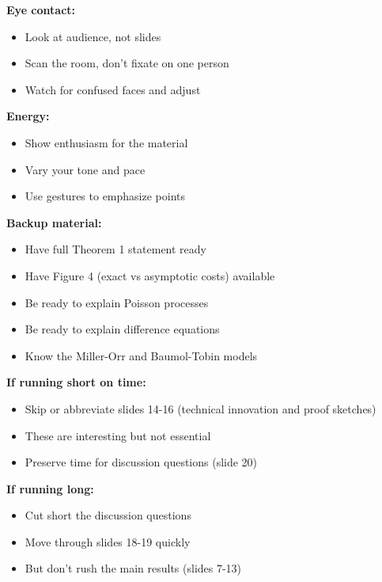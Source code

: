 \documentclass[11pt]{article}
\begin{document}
\textbf{Eye contact:}
\begin{itemize}
    \item Look at audience, not slides
    \item Scan the room, don't fixate on one person
    \item Watch for confused faces and adjust
\end{itemize}

\textbf{Energy:}
\begin{itemize}
    \item Show enthusiasm for the material
    \item Vary your tone and pace
    \item Use gestures to emphasize points
\end{itemize}

\textbf{Backup material:}
\begin{itemize}
    \item Have full Theorem 1 statement ready
    \item Have Figure 4 (exact vs asymptotic costs) available
    \item Be ready to explain Poisson processes
    \item Be ready to explain difference equations
    \item Know the Miller-Orr and Baumol-Tobin models
\end{itemize}

\textbf{If running short on time:}
\begin{itemize}
    \item Skip or abbreviate slides 14-16 (technical innovation and proof sketches)
    \item These are interesting but not essential
    \item Preserve time for discussion questions (slide 20)
\end{itemize}

\textbf{If running long:}
\begin{itemize}
    \item Cut short the discussion questions
    \item Move through slides 18-19 quickly
    \item But don't rush the main results (slides 7-13)
\end{itemize}
\end{document}

